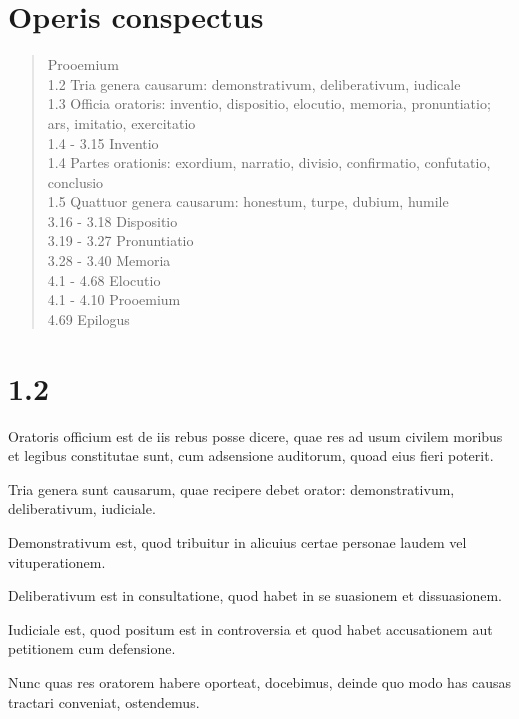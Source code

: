 

\section*{Operis conspectus}
\begin{quotation}
   Prooemium\\
1.2   Tria genera causarum: demonstrativum, deliberativum, iudicale\\
1.3   Officia oratoris: inventio, dispositio, elocutio, memoria, pronuntiatio; ars, imitatio, exercitatio\\
1.4 - 3.15   Inventio\\
1.4   Partes orationis: exordium, narratio, divisio, confirmatio, confutatio, conclusio\\
1.5   Quattuor genera causarum: honestum, turpe, dubium, humile\\
3.16 - 3.18   Dispositio\\
3.19 - 3.27   Pronuntiatio\\
3.28 - 3.40   Memoria\\
4.1 - 4.68   Elocutio\\
4.1 - 4.10   Prooemium\\
4.69   Epilogus
\end{quotation}


\section*{1.2}

Oratoris officium est de iis rebus posse dicere, quae res ad usum civilem moribus et legibus constitutae sunt, cum adsensione auditorum, quoad eius fieri poterit.

Tria genera sunt causarum, quae recipere debet orator: demonstrativum, deliberativum, iudiciale.

Demonstrativum est, quod tribuitur in alicuius certae personae laudem vel vituperationem.

Deliberativum est in consultatione, quod habet in se suasionem et dissuasionem.

Iudiciale est, quod positum est in controversia et quod habet accusationem aut petitionem cum defensione.

Nunc quas res oratorem habere oporteat, docebimus, deinde quo modo has causas tractari conveniat, ostendemus.

